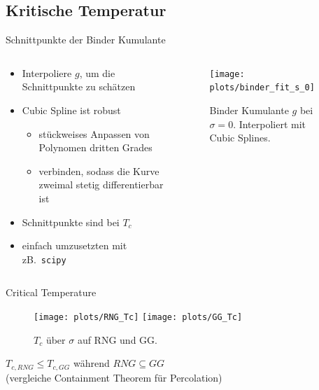 \documentclass{beamer}
\begin{document}
    \subsection{Kritische Temperatur}
        \begin{frame}{Schnittpunkte der Binder Kumulante}
            \begin{columns}[t]
                \begin{column}{5cm}
                    \begin{itemize}[<+->]
                        \item Interpoliere \(g\), um die Schnittpunkte zu schätzen
                        \item Cubic Spline ist robust
                        \begin{itemize}[<+->]
                            \item stückweises Anpassen von Polynomen dritten Grades
                            \item verbinden, sodass die Kurve zweimal stetig differentierbar ist
                        \end{itemize}
                        \item Schnittpunkte sind bei \(T_{c}\) \cite{Binder1981}
                        \item einfach umzusetzten mit zB.\ \texttt{scipy}
                    \end{itemize}
                \end{column}
                \begin{column}{6cm}
                    \begin{figure}[htbp]
                        \centering
                        \texttt{[image: plots/binder\_fit\_s\_0]}
                        \caption
                        {
                            Binder Kumulante \(g\) bei \(\sigma = 0\).
                            Interpoliert mit Cubic Splines.
                        }
                        \label{fig:gettingCrit:binder_fit_s_0}
                    \end{figure}
                \end{column}
            \end{columns}
        \end{frame}

        \begin{frame}{Critical Temperature}
            \begin{figure}[htbp]
                \centering
                \subfigure
                {
                    \label{sfig:Tc:RNG}
                    \texttt{[image: plots/RNG\_Tc]}
                }
                \subfigure
                {
                    \label{sfig:Tc:GG}
                    \texttt{[image: plots/GG\_Tc]}
                }
                \caption
                {
                    \(T_c\) über \(\sigma\) auf RNG und GG.
                }
                \label{fig:Tc}
            \end{figure}
            \pause
            \(T_{c,RNG} \le T_{c,GG}\) während \(RNG \subseteq GG\)\\
            (vergleiche Containment Theorem für Percolation)
        \end{frame}
\end{document}
